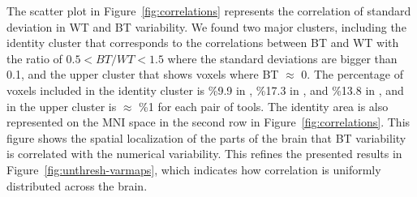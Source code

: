 \documentclass[conference]{IEEEtran}
\begin{document}
\begin{figure}[b]
  \end{figure}
  

The scatter plot in Figure~\ref{fig:correlations} represents the correlation of standard deviation in WT and BT variability.
We found two major clusters, including the identity cluster that corresponds to the correlations
between BT and WT with the ratio of $0.5 < BT/WT < 1.5$ where the standard deviations are bigger than 0.1,
and the upper cluster that shows voxels where BT $\approx$ 0.
The percentage of voxels included in the identity cluster is \%9.9 in \fslspm, \%17.3 in \fslafni, and \%13.8 in \afnispm,
and in the upper cluster is $\approx$ \%1 for each pair of tools.
The identity area is also represented on the MNI space in the second row in Figure~\ref{fig:correlations}.
This figure shows the spatial localization of the parts of the brain that BT variability is correlated with the numerical variability.
This refines the presented results in Figure~\ref{fig:unthresh-varmaps},
which indicates how correlation is uniformly distributed across the brain.
  
\end{document}
